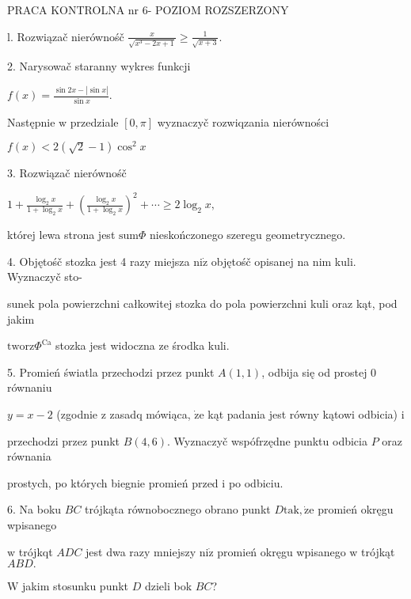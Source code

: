 \documentclass[a4paper,12pt]{article}
\begin{document}
PRACA KONTROLNA nr 6- POZIOM ROZSZERZONY

l. Rozwiązač nierównośč $\displaystyle \frac{x}{\sqrt{x^{3}-2x+1}}\geq\frac{1}{\sqrt{x+3}}.$

2. Narysowač staranny wykres funkcji

$f(x)=\displaystyle \frac{\sin 2x-|\sin x|}{\sin x}.$

Następnie $\mathrm{w}$ przedziale $[0,\pi]$ wyznaczyč rozwiqzania nierówności

$f(x)<2(\sqrt{2}-1)\cos^{2}x$

3. Rozwiązač nierównośč

$1+\displaystyle \frac{\log_{2}x}{1+\log_{2}x}+(\frac{\log_{2}x}{1+\log_{2}x})^{2}+\cdots\geq 2\log_{2}x,$

której lewa strona jest $\mathrm{s}\mathrm{u}\mathrm{m}\Phi$ nieskończonego szeregu geometrycznego.

4. Objętośč stozka jest 4 razy miejsza $\mathrm{n}\mathrm{i}\dot{\mathrm{z}}$ objętośč opisanej na nim kuli. Wyznaczyč sto-

sunek pola powierzchni całkowitej stozka do pola powierzchni kuli oraz kąt, pod jakim

$\mathrm{t}\mathrm{w}\mathrm{o}\mathrm{r}\mathrm{z}\Phi^{\mathrm{C}\mathrm{a}}$ stozka jest widoczna ze środka kuli.

5. Promień światla przechodzi przez punkt $A(1,1)$, odbija się od prostej $0$ równaniu

$y = x-2$ (zgodnie $\mathrm{z}$ zasadq mówiąca, $\dot{\mathrm{z}}\mathrm{e}$ kąt padania jest równy kątowi odbicia) $\mathrm{i}$

przechodzi przez punkt $B(4,6)$. Wyznaczyč wspófrzędne punktu odbicia $P$ oraz równania

prostych, po których biegnie promień przed $\mathrm{i}$ po odbiciu.

6. Na boku $BC$ trójkąta równobocznego obrano punkt $D\mathrm{t}\mathrm{a}\mathrm{k}, \dot{\mathrm{z}}\mathrm{e}$ promień okręgu wpisanego

$\mathrm{w}$ trójkqt $ADC$ jest dwa razy mniejszy $\mathrm{n}\mathrm{i}\dot{\mathrm{z}}$ promień okręgu wpisanego $\mathrm{w}$ trójkąt $ABD.$

$\mathrm{W}$ jakim stosunku punkt $D$ dzieli bok $BC$?
\end{document}
